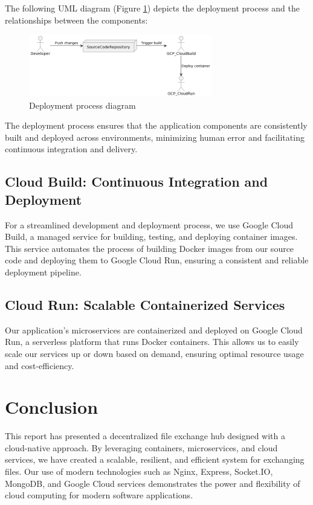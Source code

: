 \documentclass[a4paper,fleqn]{cas-dc}
\begin{document}
The following UML diagram (Figure \ref{fig:deployment}) depicts the deployment process and the relationships between the components:

\begin{figure}[h]
    \centering
    \includegraphics[width=8cm]{deployment.png}
    \caption{Deployment process diagram}
    \label{fig:deployment}
\end{figure}

The deployment process ensures that the application components are consistently built and deployed across environments, minimizing human error and facilitating continuous integration and delivery.


\subsection{Cloud Build: Continuous Integration and Deployment}

For a streamlined development and deployment process, we use Google Cloud Build, a managed service for building, testing, and deploying container images. This service automates the process of building Docker images from our source code and deploying them to Google Cloud Run, ensuring a consistent and reliable deployment pipeline.

\subsection{Cloud Run: Scalable Containerized Services}

Our application's microservices are containerized and deployed on Google Cloud Run, a serverless platform that runs Docker containers. This allows us to easily scale our services up or down based on demand, ensuring optimal resource usage and cost-efficiency.

\section{Conclusion}

This report has presented a decentralized file exchange hub designed with a cloud-native approach. By leveraging containers, microservices, and cloud services, we have created a scalable, resilient, and efficient system for exchanging files. Our use of modern technologies such as Nginx, Express, Socket.IO, MongoDB, and Google Cloud services demonstrates the power and flexibility of cloud computing for modern software applications.
\end{document}
